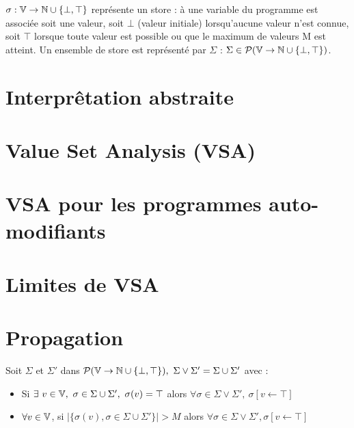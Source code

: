 
\begin{defi}
$\sigma : \mathbb V \rightarrow \mathbb N\cup\{\bot,\top\}$ représente un store : à une variable du programme est associée soit une valeur, soit $\bot$ (valeur initiale) lorsqu'aucune valeur n'est connue, soit $\top$ lorsque toute valeur est possible ou que le maximum de valeurs M est atteint. Un ensemble de store est représenté par $\Sigma$ : $\Sigma\in\mathcal P(\mathbb V\rightarrow\mathbb N\cup\{\bot,\top\})$.\\
\end{defi}


\section{Interprêtation abstraite}
\section{Value Set Analysis (VSA)}

\section{VSA pour les programmes auto-modifiants}


\section{Limites de VSA}

\section{Propagation}
\begin{defi}
Soit $\Sigma$ et $\Sigma'$ dans $\mathcal P(\mathbb V\rightarrow\mathbb N\cup\{\bot,\top\}),\ \Sigma \vee \Sigma'=\Sigma \cup \Sigma'$ avec : 
\begin{itemize}
 \item Si $\exists\ v\in\BV,\ \sigma\in\Sigma\cup\Sigma',\ \sigma(v)=\top$ alors $\forall\sigma\in\Sigma\vee\Sigma',\ \sigma[v\leftarrow\top]$
 \item $\forall v\in\mathbb V$, si $|\{\sigma(v), \sigma\in\Sigma\cup\Sigma'\}|>M$ alors $\forall\sigma\in\Sigma\vee\Sigma',\sigma[v\leftarrow\top]$
\end{itemize}
\end{defi}

